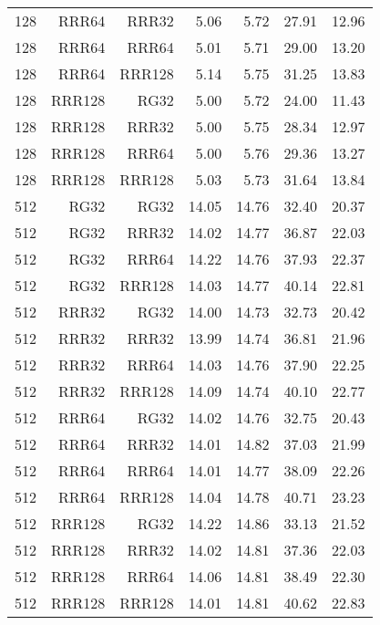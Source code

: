 \begin{table}
\begin{tabular}{|r|r|r|r|r|r|r|}
128 & RRR64 & RRR32 & 5.06 & 5.72 & 27.91 & 12.96 \\
128 & RRR64 & RRR64 & 5.01 & 5.71 & 29.00 & 13.20 \\
128 & RRR64 & RRR128 & 5.14 & 5.75 & 31.25 & 13.83 \\
128 & RRR128 & RG32 & 5.00 & 5.72 & 24.00 & 11.43 \\
128 & RRR128 & RRR32 & 5.00 & 5.75 & 28.34 & 12.97 \\
128 & RRR128 & RRR64 & 5.00 & 5.76 & 29.36 & 13.27 \\
128 & RRR128 & RRR128 & 5.03 & 5.73 & 31.64 & 13.84 \\
512 & RG32 & RG32 & 14.05 & 14.76 & 32.40 & 20.37 \\
512 & RG32 & RRR32 & 14.02 & 14.77 & 36.87 & 22.03 \\
512 & RG32 & RRR64 & 14.22 & 14.76 & 37.93 & 22.37 \\
512 & RG32 & RRR128 & 14.03 & 14.77 & 40.14 & 22.81 \\
512 & RRR32 & RG32 & 14.00 & 14.73 & 32.73 & 20.42 \\
512 & RRR32 & RRR32 & 13.99 & 14.74 & 36.81 & 21.96 \\
512 & RRR32 & RRR64 & 14.03 & 14.76 & 37.90 & 22.25 \\
512 & RRR32 & RRR128 & 14.09 & 14.74 & 40.10 & 22.77 \\
512 & RRR64 & RG32 & 14.02 & 14.76 & 32.75 & 20.43 \\
512 & RRR64 & RRR32 & 14.01 & 14.82 & 37.03 & 21.99 \\
512 & RRR64 & RRR64 & 14.01 & 14.77 & 38.09 & 22.26 \\
512 & RRR64 & RRR128 & 14.04 & 14.78 & 40.71 & 23.23 \\
512 & RRR128 & RG32 & 14.22 & 14.86 & 33.13 & 21.52 \\
512 & RRR128 & RRR32 & 14.02 & 14.81 & 37.36 & 22.03 \\
512 & RRR128 & RRR64 & 14.06 & 14.81 & 38.49 & 22.30 \\
512 & RRR128 & RRR128 & 14.01 & 14.81 & 40.62 & 22.83 \\
\hline
\end{tabular}
\end{table}

